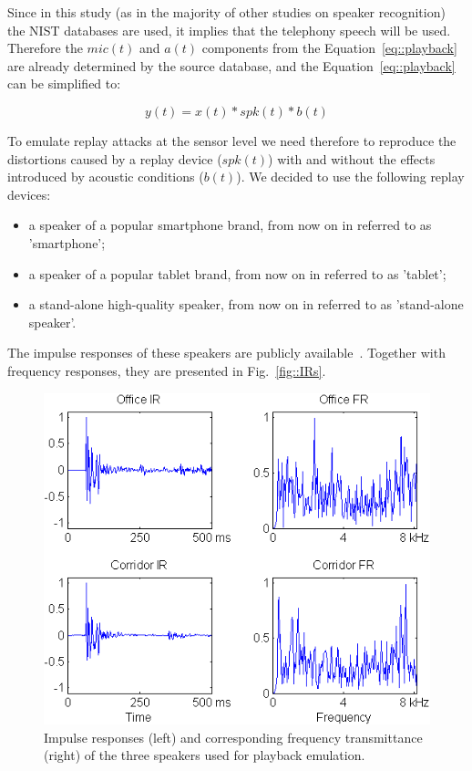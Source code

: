 Since in this study (as in the majority of other studies on speaker recognition) the NIST databases are used, it implies that the telephony speech will be used. Therefore the $mic(t)$ and $a(t)$ components from the Equation~\ref{eq::playback} are already determined by the source database, and the Equation~\ref{eq::playback} can be simplified to:

\begin{equation}
y(t) = x(t)* spk(t) * b(t)
\label{eq:playback_simple}
\end{equation}

To emulate replay attacks at the sensor level we need therefore to reproduce the distortions caused by a replay device ($spk(t)$) with and without the effects introduced by acoustic conditions ($b(t)$). We decided to use the following replay devices:

\begin{itemize}
\item a speaker of a popular smartphone brand, from now on in referred to as 'smartphone';
\item a speaker of a popular tablet brand, from now on in referred to as 'tablet';
\item a stand-alone high-quality speaker, from now on in referred to as 'stand-alone speaker'.
\end{itemize}

The impulse responses of these speakers are publicly available~\cite{Brown2014}. Together with frequency responses, they are presented in Fig.~\ref{fig::IRs}.



\begin{figure}
	\centering
	\includegraphics[width=1\linewidth]{Figs/Room_IRs.png}
	\caption{Impulse responses (left) and corresponding frequency transmittance (right) of the three speakers used for playback emulation.}
	\label{fig::Room_IRs}
\end{figure}

